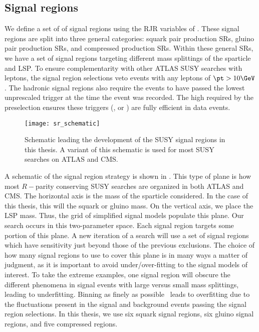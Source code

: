 

\subsection{Signal regions}
We define a set of of signal regions using the RJR variables of .
These signal regions are split into three general categories: squark pair production SRs, gluino pair production SRs, and compressed production SRs.
Within these general SRs, we have a set of signal regions targeting different mass splittings of the sparticle and LSP.
To ensure complementarity with other ATLAS SUSY searches with leptons, the signal region selections veto events with any leptons of $\pt > 10 \GeV$.
The hadronic signal regions also require the events to have passed the lowest unprescaled \met trigger at the time the event was recorded.
The high \met required by the preselection ensures these triggers (,  or ) are fully efficient in data events.
\begin{figure}[tbp]
\caption{Schematic leading the development of the SUSY signal regions in this thesis.
A variant of this schematic is used for most SUSY searches on ATLAS and CMS.
} \label{fig:sr_schematic}
\texttt{[image: sr\_schematic]}
\end{figure}

A schematic of the signal region strategy is shown in .
This type of plane is how most $R-$parity conserving SUSY searches are organized in both ATLAS and CMS.
The horizontal axis is the mass of the sparticle considered.
In the case of this thesis, this will the squark or gluino mass.
On the vertical axis, we place the LSP mass.
Thus, the grid of simplified signal models populate this plane.
Our search occurs in this two-parameter space.
Each signal region targets some portion of this plane.
A new iteration of a search will use a set of signal regions which have sensitivity just beyond those of the previous exclusions.
The choice of how many signal regions to use to cover this plane is in many ways a matter of judgment, as it is important to avoid under/over-fitting to the signal models of interest.
To take the extreme examples, one signal region will obscure the different phenomena in signal events with large versus small mass splittings, leading to underfitting.
Binning as finely as possible\footnotemark~ leads to overfitting due to the fluctuations present in the signal and background events passing the signal region selections.
In this thesis, we use six squark signal regions, six gluino signal regions, and five compressed regions.

